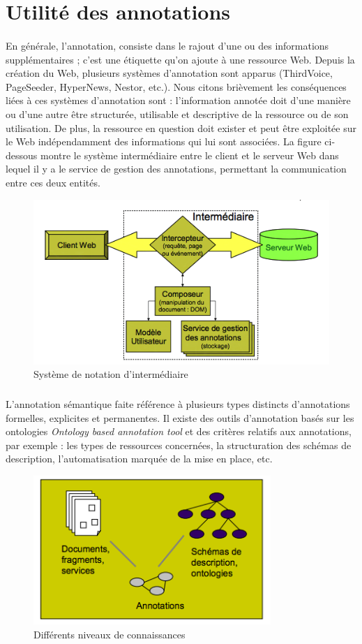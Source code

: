 \section{Utilité des annotations}
\paragraph{}
En générale, l'annotation, consiste dans le rajout d'une ou des informations supplémentaires ; c'est une étiquette qu'on ajoute à une ressource Web. Depuis la création du Web, plusieurs systèmes d'annotation sont apparus (ThirdVoice, PageSeeder, HyperNews, Nestor, etc.).
Nous citons brièvement les conséquences liées à ces systèmes d'annotation sont : l'information annotée doit d'une manière ou d'une autre être structurée, utilisable et descriptive de la ressource ou de son utilisation. De plus, la ressource en question doit exister et peut être exploitée sur le Web indépendamment des informations qui lui sont associées. La figure ci-dessous montre le système intermédiaire entre le client et le serveur Web dans lequel il y a le service de gestion des annotations, permettant la communication entre ces deux entités.
\begin{figure}[H]
\centering
\includegraphics[width=14cm]{AnnotationSys.png}
\caption{Système de notation d'intermédiaire}
\end{figure}
\subparagraph{}
L'annotation sémantique faite référence à plusieurs types distincts d'annotations formelles, explicites et permanentes. Il existe des outils d'annotation basés sur les ontologies {\it Ontology based annotation tool}
et des critères relatifs aux annotations, par exemple : les types de ressources concernées, la structuration des schémas de description, l'automatisation marquée de la mise en place, etc.
\begin{figure}[H]
\centering
\includegraphics[width=9cm]{diffConnaissances.png}
\caption{Différents niveaux de connaissances}
\end{figure}
